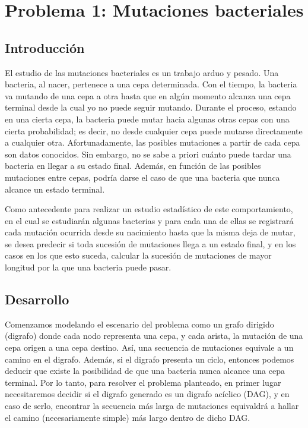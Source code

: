 \section{Problema 1: Mutaciones bacteriales}
 
\subsection{Introducci\'on}

El estudio de las mutaciones bacteriales es un trabajo arduo y pesado. 
Una bacteria, al nacer, pertenece a una cepa determinada. 
Con el tiempo, la bacteria va mutando de una cepa a otra hasta que en
alg\'un momento alcanza una cepa terminal desde la cual yo no puede seguir mutando. 
Durante el proceso, estando en una cierta cepa, la bacteria puede mutar hacia algunas otras cepas con una cierta probabilidad;
es decir, no desde cualquier cepa puede mutarse directamente a cualquier otra. 
Afortunadamente, las posibles mutaciones a partir de cada cepa son datos conocidos.
Sin embargo, no se sabe
a priori cu\'anto puede tardar una bacteria en llegar a su estado final. 
Adem\'as, en funci\'on de las posibles mutaciones entre cepas, podr\'ia darse el caso de
que una bacteria que nunca alcance un estado terminal.

Como antecedente para realizar un estudio estad\'istico de este comportamiento, en el cual se estudiar\'an algunas bacterias y para cada una de ellas se registrar\'a cada mutaci\'on ocurrida desde su nacimiento hasta que la misma deja de mutar, se desea predecir si toda sucesi\'on de mutaciones llega a un estado final, y en los casos en los que esto suceda, calcular la sucesi\'on de mutaciones de mayor longitud por la que una bacteria puede
pasar. 

\subsection{Desarrollo}

Comenzamos modelando el escenario del problema como un grafo dirigido (digrafo) donde cada nodo representa una cepa, y cada arista, la mutación de una cepa origen a una cepa destino. 
As\'i, una secuencia de mutaciones equivale a un camino en el digrafo. 
Adem\'as, si el digrafo presenta un ciclo, entonces podemos deducir que existe la posibilidad de que una bacteria nunca alcance una cepa terminal.
Por lo tanto, para resolver el problema planteado, en primer lugar necesitaremos decidir si el digrafo generado es un digrafo ac\'iclico (DAG), y en caso de serlo, encontrar la secuencia m\'as larga de mutaciones equivaldr\'a a hallar el camino (necesariamente simple) m\'as largo dentro de dicho DAG.

